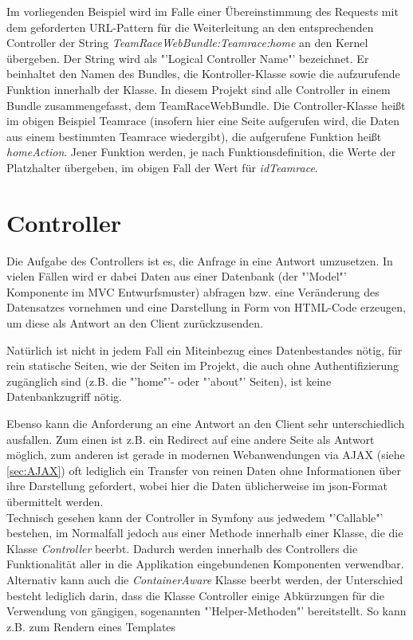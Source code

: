 \documentclass[12pt]{report}
\begin{document}
Im vorliegenden Beispiel wird im Falle einer Übereinstimmung des Requests mit dem geforderten URL-Pattern für die Weiterleitung an den entsprechenden Controller der String \emph{TeamRaceWebBundle:Teamrace:home} an den Kernel übergeben. Der String wird als "'Logical Controller Name"' bezeichnet. Er beinhaltet den Namen des Bundles, die Kontroller-Klasse sowie die aufzurufende Funktion innerhalb der Klasse. In diesem Projekt sind alle Controller in einem Bundle zusammengefasst, dem TeamRaceWebBundle. Die Controller-Klasse heißt im obigen Beispiel Teamrace (insofern hier eine Seite aufgerufen wird, die Daten aus einem bestimmten Teamrace wiedergibt), die aufgerufene Funktion heißt \emph{homeAction}. Jener Funktion werden, je nach Funktionsdefinition, die Werte der Platzhalter übergeben, im obigen Fall der Wert für \emph{idTeamrace}.

\section{Controller}
Die Aufgabe des Controllers ist es, die Anfrage in eine Antwort umzusetzen. In vielen Fällen wird er dabei Daten aus einer Datenbank (der "'Model"' Komponente im MVC Entwurfsmuster) abfragen bzw. eine Veränderung des Datensatzes vornehmen und eine Darstellung in Form von HTML-Code erzeugen, um diese als Antwort an den Client zurückzusenden.

Natürlich ist nicht in jedem Fall ein Miteinbezug eines Datenbestandes nötig, für rein statische Seiten, wie der Seiten im Projekt, die auch ohne Authentifizierung zugänglich sind (z.B. die "'home"'- oder "'about"' Seiten), ist keine Datenbankzugriff nötig.

Ebenso kann die Anforderung an eine Antwort an den Client sehr unterschiedlich ausfallen. Zum einen ist z.B. ein Redirect auf eine andere Seite als Antwort möglich, zum anderen ist gerade in modernen Webanwendungen via AJAX (siehe \ref{sec:AJAX}) oft lediglich ein Transfer von reinen Daten ohne Informationen über ihre Darstellung gefordert, wobei hier die Daten üblicherweise im json-Format übermittelt werden.\\

Technisch gesehen kann der Controller in Symfony aus jedwedem "'Callable"' bestehen, im Normalfall jedoch aus einer Methode innerhalb einer Klasse, die die Klasse \emph{Controller} beerbt. Dadurch werden innerhalb des Controllers die Funktionalität aller in die Applikation eingebundenen Komponenten verwendbar. Alternativ kann auch die \emph{ContainerAware} Klasse beerbt werden, der Unterschied besteht lediglich darin, dass die Klasse Controller einige Abkürzungen für die Verwendung von gängigen, sogenannten "'Helper-Methoden"' bereitstellt. So kann z.B. zum Rendern eines Templates
\end{document}
